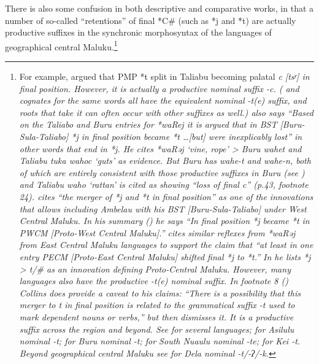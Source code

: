 There is also some confusion in both descriptive
and comparative works, in that a number of so-called “retentions”
of final *C{\#} (such as *j
and *t) are actually productive suffixes in the synchronic morphosyntax
of the languages of geographical central Maluku.\footnote{\label{fn:Collins-Final-t}
		For example, \citet[32]{Collins1981} argued that PMP *t split in Taliabu becoming
		palatal \it{c} [tsʸ] in final position.
		However, it is actually a productive nominal suffix \it{-c}.
		( and  cognates for the same
		words all have the equivalent nominal \it{-t(e)} suffix,
		and roots that take it can often occur with other suffixes as
		well.) \citet[34]{Collins1981} also says “Based on the Taliabo
		and Buru entries for *waRej it is argued that in BST [Buru-Sula-Taliabo]
		*j in final position became *t {\ldots}[but] were inexplicably
		lost” in other words that end in *j.
		He cites *waRəj ‘vine,
		rope’ > Buru \it{wahet}
		and Taliabu \it{tuka wahoc} ‘guts’ as evidence.
		But Buru has \it{wahe-t}
		and \it{wahe-n}, both of which are entirely consistent with those
		productive suffixes in Buru (see \citealp[987]{GrimesGrimes2020})
		and Taliabu \it{waho} ‘rattan’ is cited as showing “loss of final
		\it{c}” (p.43, footnote 24).
		\citet[36]{Collins1981} cites “the merger of *j
		and *t in final position” as one of the innovations that allows
		including Ambelau with his BST [Buru-Sula-Taliabo] under West Central Maluku.
		In his summary (\citeyear[38]{Collins1981}) he says “In final position *j became
		*t in PWCM [Proto-West Central Maluku].”
		\citet[39--40]{Collins1981} cites similar reflexes from *waRəj from
		East Central Maluku languages to support the claim that “at least
		in one entry PECM [Proto-East Central Maluku] shifted final *j to *t.”
		In \citet[40]{Collins1981} he lists *j > \it{t}/{\gap}{\#}
		as an innovation defining Proto-Central Maluku.
		However, many  languages also have the
		productive \it{-t(e)} nominal suffix.
		In footnote 8 (\citeyear[42]{Collins1981}) Collins does provide a caveat to his
		claims: “There is a possibility that this merger to \it{t} in
		final position is related to the grammatical suffix \it{-t} used
		to mark dependent nouns or verbs,” but then dismisses it.
		It is a productive suffix across the region and beyond.
		See \citet[30--33]{Collins1983} for several languages; \citet[xxx]{Collins2003a}
		for Asilulu nominal \it{-t}; \citet{Grimes1991c} for Buru nominal
		\it{-t}; \citet{Bolton1990} for South Nuaulu nominal \it{-te;}
		\citet{Travis2019} for Kei \it{-t}.
		Beyond geographical central Maluku see \citet{Tamelan2021} for
		Dela nominal \it{-t/-ʔ/-k}.}
